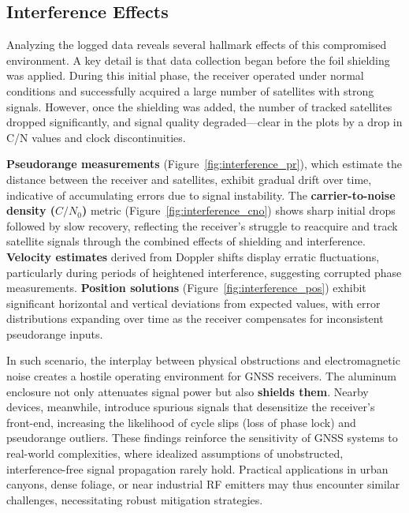         \subsection{Interference Effects}

        \noindent
        Analyzing the logged data reveals several hallmark effects of this compromised environment. A key detail is that data collection began before the foil shielding was applied. During this initial phase, the receiver operated under normal conditions and successfully acquired a large number of satellites with strong signals. However, once the shielding was added, the number of tracked satellites dropped significantly, and signal quality degraded—clear in the plots by a drop in C/N values and clock discontinuities.
        
        \textbf{Pseudorange measurements} (Figure~\ref{fig:interference_pr}), which estimate the distance between the receiver and satellites, exhibit gradual drift over time, indicative of accumulating errors due to signal instability. The \textbf{carrier-to-noise density ($C/N_0$)} metric (Figure~\ref{fig:interference_cno}) shows sharp initial drops followed by slow recovery, reflecting the receiver's struggle to reacquire and track satellite signals through the combined effects of shielding and interference. \textbf{Velocity estimates} derived from Doppler shifts display erratic fluctuations, particularly during periods of heightened interference, suggesting corrupted phase measurements. \textbf{Position solutions} (Figure~\ref{fig:interference_pos}) exhibit significant horizontal and vertical deviations from expected values, with error distributions expanding over time as the receiver compensates for inconsistent pseudorange inputs.
        

        \noindent
        In such scenario, the interplay between physical obstructions and electromagnetic noise creates a hostile operating environment for GNSS receivers. The aluminum enclosure not only attenuates signal power but also \textbf{shields them}. Nearby devices, meanwhile, introduce spurious signals that desensitize the receiver's front-end, increasing the likelihood of cycle slips (loss of phase lock) and pseudorange outliers. These findings reinforce the sensitivity of GNSS systems to real-world complexities, where idealized assumptions of unobstructed, interference-free signal propagation rarely hold. Practical applications in urban canyons, dense foliage, or near industrial RF emitters may thus encounter similar challenges, necessitating robust mitigation strategies.
        

